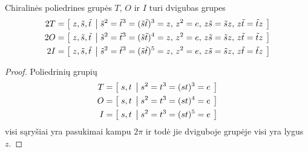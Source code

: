 \begin{proposition}
	Chiralinės poliedrines grupės $T$, $O$ ir $I$ turi dvigubas grupes
	\begin{equation}
		\begin{aligned}
			2T &= \left[\; z,\tilde s,\tilde t \;\left|\; \tilde s^2=\tilde t^3=(\tilde s\tilde t)^3=z,\,z^2=e,\,z\tilde s=\tilde sz,\,z\tilde t=\tilde tz \;\right.\right] \\
			2O &= \left[\; z,\tilde s,\tilde t \;\left|\; \tilde s^2=\tilde t^3=(\tilde s\tilde t)^4=z,\,z^2=e,\,z\tilde s=\tilde sz,\,z\tilde t=\tilde tz \;\right.\right] \\
			2I &= \left[\; z,\tilde s,\tilde t \;\left|\; \tilde s^2=\tilde t^3=(\tilde s\tilde t)^5=z,\,z^2=e,\,z\tilde s=\tilde sz,\,z\tilde t=\tilde tz \;\right.\right]
		\end{aligned}
	\end{equation}
\end{proposition}
\begin{proof}
	Poliedrinių grupių
	\begin{equation}
		\begin{aligned}
			T &= \left[\; s,t \;\left|\; s^2=t^3=(st)^3=e \;\right.\right] \\
			O &= \left[\; s,t \;\left|\; s^2=t^3=(st)^4=e \;\right.\right] \\
			I &= \left[\; s,t \;\left|\; s^2=t^3=(st)^5=e \;\right.\right]
		\end{aligned}
	\end{equation}
	visi sąryšiai yra pasukimai kampu $2\pi$ ir todė jie dviguboje grupėje visi yra lygus $z$.
\end{proof}








